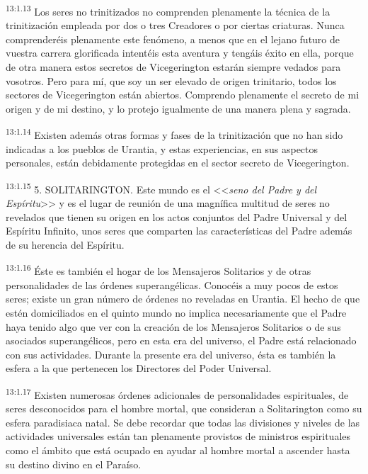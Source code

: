 \par
\textsuperscript{13:1.13} Los seres no trinitizados no comprenden plenamente la técnica de la trinitización empleada por dos o tres Creadores o por ciertas criaturas. Nunca comprenderéis plenamente este fenómeno, a menos que en el lejano futuro de vuestra carrera glorificada intentéis esta aventura y tengáis éxito en ella, porque de otra manera estos secretos de Vicegerington estarán siempre vedados para vosotros. Pero para mí, que soy un ser elevado de origen trinitario, todos los sectores de Vicegerington están abiertos. Comprendo plenamente el secreto de mi origen y de mi destino, y lo protejo igualmente de una manera plena y sagrada.

\par
\textsuperscript{13:1.14} Existen además otras formas y fases de la trinitización que no han sido indicadas a los pueblos de Urantia, y estas experiencias, en sus aspectos personales, están debidamente protegidas en el sector secreto de Vicegerington.

\par
\textsuperscript{13:1.15} 5. SOLITARINGTON. Este mundo es el <<\textit{seno del Padre y del Espíritu}>> y es el lugar de reunión de una magnífica multitud de seres no revelados que tienen su origen en los actos conjuntos del Padre Universal y del Espíritu Infinito, unos seres que comparten las características del Padre además de su herencia del Espíritu.

\par
\textsuperscript{13:1.16} Éste es también el hogar de los Mensajeros Solitarios y de otras personalidades de las órdenes superangélicas. Conocéis a muy pocos de estos seres; existe un gran número de órdenes no reveladas en Urantia. El hecho de que estén domiciliados en el quinto mundo no implica necesariamente que el Padre haya tenido algo que ver con la creación de los Mensajeros Solitarios o de sus asociados superangélicos, pero en esta era del universo, el Padre está relacionado con sus actividades. Durante la presente era del universo, ésta es también la esfera a la que pertenecen los Directores del Poder Universal.

\par
\textsuperscript{13:1.17} Existen numerosas órdenes adicionales de personalidades espirituales, de seres desconocidos para el hombre mortal, que consideran a Solitarington como su esfera paradisiaca natal. Se debe recordar que todas las divisiones y niveles de las actividades universales están tan plenamente provistos de ministros espirituales como el ámbito que está ocupado en ayudar al hombre mortal a ascender hasta su destino divino en el Paraíso.

